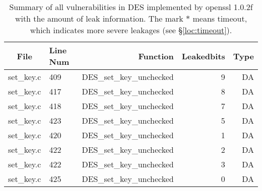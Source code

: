 \begin{table}%
\centering\tiny\scriptsize
\caption{Summary of all vulnerabilities in DES implemented by openssl 1.0.2f with the amount of leak information. The mark $*$ means timeout, which indicates more severe leakages (see \S\ref{loc:timeout}).}\label{tab:DESopenssl}
\begin{tabular}{clrrr}
\hline
\textbf{File} & \textbf{Line Num} & \textbf{Function} & \textbf{Leakedbits} & \textbf{Type} \\\hline
set\_key.c& 409&DES\_set\_key\_unchecked&9 &DA\\
set\_key.c& 417&DES\_set\_key\_unchecked&8 &DA\\
set\_key.c& 418&DES\_set\_key\_unchecked&7 &DA\\
set\_key.c& 423&DES\_set\_key\_unchecked&5 &DA\\
set\_key.c& 420&DES\_set\_key\_unchecked&1 &DA\\
set\_key.c& 422&DES\_set\_key\_unchecked&2 &DA\\
set\_key.c& 422&DES\_set\_key\_unchecked&3 &DA\\
set\_key.c& 425&DES\_set\_key\_unchecked&0 &DA\\
\hline
\end{tabular}
\end{table}